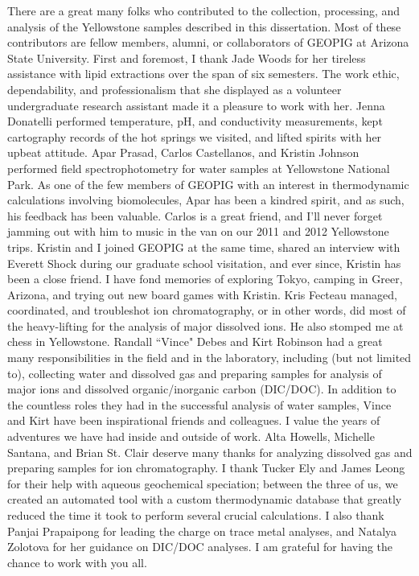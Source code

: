 There are a great many folks who contributed to the collection, processing, and analysis of the Yellowstone samples described in this dissertation. Most of these contributors are fellow members, alumni, or collaborators of GEOPIG at Arizona State University. First and foremost, I thank Jade Woods for her tireless assistance with lipid extractions over the span of six semesters. The work ethic, dependability, and professionalism that she displayed as a volunteer undergraduate research assistant made it a pleasure to work with her. Jenna Donatelli performed temperature, pH, and conductivity measurements, kept cartography records of the hot springs we visited, and lifted spirits with her upbeat attitude. Apar Prasad, Carlos Castellanos, and Kristin Johnson performed field spectrophotometry for water samples at Yellowstone National Park. As one of the few members of GEOPIG with an interest in thermodynamic calculations involving biomolecules, Apar has been a kindred spirit, and as such, his feedback has been valuable. Carlos is a great friend, and I'll never forget jamming out with him to music in the van on our 2011 and 2012 Yellowstone trips. Kristin and I joined GEOPIG at the same time, shared an interview with Everett Shock during our graduate school visitation, and ever since, Kristin has been a close friend. I have fond memories of exploring Tokyo, camping in Greer, Arizona, and trying out new board games with Kristin. Kris Fecteau managed, coordinated, and troubleshot ion chromatography, or in other words, did most of the heavy-lifting for the analysis of major dissolved ions. He also stomped me at chess in Yellowstone. Randall ``Vince" Debes and Kirt Robinson had a great many responsibilities in the field and in the laboratory, including (but not limited to), collecting water and dissolved gas and preparing samples for analysis of major ions and dissolved organic/inorganic carbon (DIC/DOC). In addition to the countless roles they had in the successful analysis of water samples, Vince and Kirt have been inspirational friends and colleagues. I value the years of adventures we have had inside and outside of work. Alta Howells, Michelle Santana, and Brian St. Clair deserve many thanks for analyzing dissolved gas and preparing samples for ion chromatography. I thank Tucker Ely and James Leong for their help with aqueous geochemical speciation; between the three of us, we created an automated tool with a custom thermodynamic database that greatly reduced the time it took to perform several crucial calculations. I also thank Panjai Prapaipong for leading the charge on trace metal analyses, and Natalya Zolotova for her guidance on DIC/DOC analyses. I am grateful for having the chance to work with you all.

